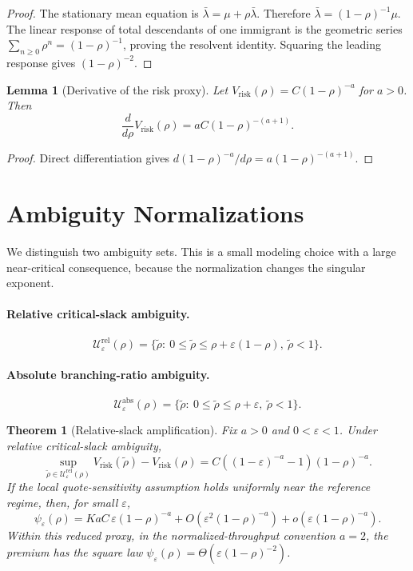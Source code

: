 \documentclass[11pt]{article}
\newtheorem{lemma}[assumption]{Lemma}
\newtheorem{theorem}[assumption]{Theorem}
\newcommand{\eps}{\varepsilon}
\begin{document}
\begin{proof}
The stationary mean equation is
$\bar\lambda=\mu+\rho\bar\lambda$. Therefore
$\bar\lambda=(1-\rho)^{-1}\mu$. The linear response of total descendants of one
immigrant is the geometric series $\sum_{n\ge0}\rho^n=(1-\rho)^{-1}$, proving
the resolvent identity. Squaring the leading response gives
$(1-\rho)^{-2}$.
\end{proof}

\begin{lemma}[Derivative of the risk proxy]
Let $V_{\mathrm{risk}}(\rho)=C(1-\rho)^{-a}$ for $a>0$. Then
\[
\frac{d}{d\rho}V_{\mathrm{risk}}(\rho)
=aC(1-\rho)^{-(a+1)}.
\]
\end{lemma}

\begin{proof}
Direct differentiation gives
$d(1-\rho)^{-a}/d\rho=a(1-\rho)^{-(a+1)}$.
\end{proof}

\section{Ambiguity Normalizations}

We distinguish two ambiguity sets. This is a small modeling choice with a large
near-critical consequence, because the normalization changes the singular
exponent.

\paragraph{Relative critical-slack ambiguity.}
\[
\mathcal U^{\mathrm{rel}}_\eps(\rho)
=\{\tilde\rho:\ 0\le \tilde\rho\le \rho+\eps(1-\rho),\ \tilde\rho<1\}.
\]

\paragraph{Absolute branching-ratio ambiguity.}
\[
\mathcal U^{\mathrm{abs}}_\eps(\rho)
=\{\tilde\rho:\ 0\le \tilde\rho\le \rho+\eps,\ \tilde\rho<1\}.
\]

\begin{theorem}[Relative-slack amplification]
Fix $a>0$ and $0<\eps<1$. Under relative critical-slack ambiguity,
\[
\sup_{\tilde\rho\in\mathcal U^{\mathrm{rel}}_\eps(\rho)}
V_{\mathrm{risk}}(\tilde\rho)-V_{\mathrm{risk}}(\rho)
=C\left((1-\eps)^{-a}-1\right)(1-\rho)^{-a}.
\]
If the local quote-sensitivity assumption holds uniformly near the reference
regime, then, for small $\eps$,
\[
\psi_\eps(\rho)
=KaC\,\eps(1-\rho)^{-a}+O(\eps^2(1-\rho)^{-a})+o(\eps(1-\rho)^{-a}).
\]
Within this reduced proxy, in the normalized-throughput convention $a=2$, the
premium has the square law
$\psi_\eps(\rho)=\Theta(\eps(1-\rho)^{-2})$.
\end{theorem}
\end{document}

